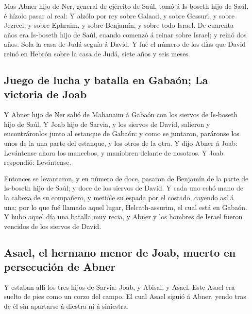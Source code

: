  Mas Abner hijo de Ner, general de ejército de Saúl, tomó
á Is-boseth hijo de Saúl, é hízolo pasar al real:  Y
alzólo por rey sobre Galaad, y sobre Gessuri, y sobre Jezreel, y sobre
Ephraim, y sobre Benjamín, y sobre todo Israel.  De
cuarenta años era Is-boseth hijo de Saúl, cuando comenzó á reinar sobre
Israel; y reinó dos años. Sola la casa de Judá seguía á David.
 Y fué el número de los días que David reinó en Hebrón
sobre la casa de Judá, siete años y seis meses.

\hypertarget{juego-de-lucha-y-batalla-en-gabauxf3n-la-victoria-de-joab}{%
\subsection{Juego de lucha y batalla en Gabaón; La victoria de
Joab}\label{juego-de-lucha-y-batalla-en-gabauxf3n-la-victoria-de-joab}}

 Y Abner hijo de Ner salió de Mahanaim á Gabaón con los
siervos de Is-boseth hijo de Saúl.  Y Joab hijo de
Sarvia, y los siervos de David, salieron y encontráronlos junto al
estanque de Gabaón: y como se juntaron, paráronse los unos de la una
parte del estanque, y los otros de la otra.  Y dijo Abner
á Joab: Levántense ahora los mancebos, y maniobren delante de nosotros.
Y Joab respondió: Levántense.

 Entonces se levantaron, y en número de doce, pasaron de
Benjamín de la parte de Is-boseth hijo de Saúl; y doce de los siervos de
David.  Y cada uno echó mano de la cabeza de su
compañero, y metióle su espada por el costado, cayendo así á una; por lo
que fué llamado aquel lugar, Helcath-assurim, el cual está en Gabaón.
 Y hubo aquel día una batalla muy recia, y Abner y los
hombres de Israel fueron vencidos de los siervos de David.

\hypertarget{asael-el-hermano-menor-de-joab-muerto-en-persecuciuxf3n-de-abner}{%
\subsection{Asael, el hermano menor de Joab, muerto en persecución de
Abner}\label{asael-el-hermano-menor-de-joab-muerto-en-persecuciuxf3n-de-abner}}

 Y estaban allí los tres hijos de Sarvia: Joab, y Abisai,
y Asael. Este Asael era suelto de pies como un corzo del campo.
 El cual Asael siguió á Abner, yendo tras de él sin
apartarse á diestra ni á siniestra.

